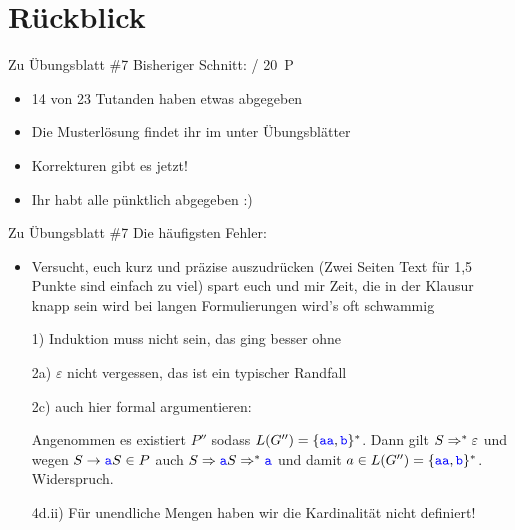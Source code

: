 



\morescalingdelimiters



\section{Rückblick}

\begin{frame}{Zu Übungsblatt \#7}
	Bisheriger Schnitt:  / 20~P

	\begin{itemize}[<+->]
		\item 14 von 23 Tutanden haben etwas abgegeben
		\item Die Musterlösung findet ihr im \ILIAS unter Übungsblätter
		\item Korrekturen gibt es jetzt!
		\item Ihr habt alle pünktlich abgegeben :)
	\end{itemize}
\end{frame}

\begin{frame}{Zu Übungsblatt \#7}
	Die häufigsten Fehler:
	\begin{itemize}[<+->]
		\item Versucht, euch kurz und präzise auszudrücken \small{(Zwei Seiten Text für 1,5 Punkte sind einfach zu viel)}
		\implitem spart euch und mir Zeit, die in der Klausur knapp sein wird
		\implitem bei langen Formulierungen wird's oft schwammig
		\item[1)] Induktion muss nicht sein, das ging besser ohne
		\item[2a)] $\varepsilon$ nicht vergessen, das ist ein typischer Randfall
		\item[2c)] auch hier formal argumentieren:
		\item[] Angenommen es existiert $P''$ sodass $L(G'')=\{\hbox{\textcolor{blue}{\texttt{aa}}},\hbox{\textcolor{blue}{\texttt{b}}}\}^*$. Dann gilt $S \Rightarrow^* \varepsilon$ und wegen $S\rightarrow \hbox{\textcolor{blue}{\texttt{a}}}S \in P$ auch $S \Rightarrow \hbox{\textcolor{blue}{\texttt{a}}}S \Rightarrow^* \hbox{\textcolor{blue}{\texttt{a}}}$ und damit $a\in L(G'')=\{\hbox{\textcolor{blue}{\texttt{aa}}},\hbox{\textcolor{blue}{\texttt{b}}}\}^*$. Widerspruch.
		\item[4d.ii)] Für unendliche Mengen haben wir die Kardinalität nicht definiert! 
	\end{itemize}
\end{frame}


